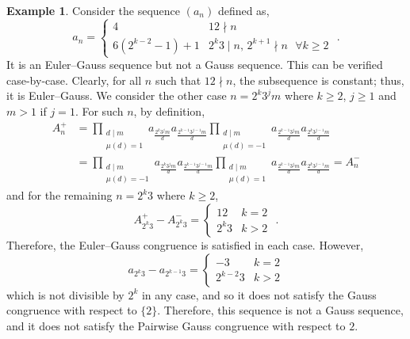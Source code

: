 \documentclass{article}
\numberwithin{equation}{section}
\theoremstyle{definition}
\newtheorem{example}[definition]{\bf {Example}}
\begin{document}
\begin{example}\label{ex:2}
    Consider the sequence $(a_n)$ defined as, 
\[
    a_n=
    \begin{cases}
        4 & 12 \nmid n\\
        6(2^{k-2}-1)+1 & 2^k3\mid n\text{, }2^{k+1}\nmid n\text{ }\forall k\geq2
    \end{cases}
    \text{ .}
\]
It is an Euler--Gauss sequence but not a Gauss sequence. This can be verified case-by-case. Clearly, for all $n$ such that $12\nmid n$, the subsequence is constant; thus, it is Euler--Gauss. We consider the other case $n=2^k3^jm$ where $k\geq2$, $j\geq1$ and $m>1$ if $j=1$. For such $n$, by definition,
\begin{align*}
    A_n^+&=\prod_{\substack{d\mid m\\\mu(d)=1}}a_\frac{2^k3^jm}{d}a_\frac{2^{k-1}3^{j-1}m}{d}\prod_{\substack{d\mid m\\\mu(d)=-1}}a_\frac{2^{k-1}3^jm}{d}a_\frac{2^k3^{j-1}m}{d}\\&=\prod_{\substack{d\mid m\\\mu(d)=-1}}a_\frac{2^k3^jm}{d}a_\frac{2^{k-1}3^{j-1}m}{d}\prod_{\substack{d\mid m\\\mu(d)=1}}a_\frac{2^{k-1}3^jm}{d}a_\frac{2^k3^{j-1}m}{d}=A_n^-
\end{align*}
and for the remaining $n=2^k3$ where $k\geq2$,  
\[A_{2^k3}^+-A_{2^k3}^-=\begin{cases}
    12 &k=2\\
    2^{k}3&k>2
\end{cases}
\text{ .}
\]
Therefore, the Euler--Gauss congruence is satisfied in each case. However,  
\[a_{2^k3}-a_{2^{k-1}3}=\begin{cases}
    -3 &k=2\\
    2^{k-2}3&k>2
\end{cases}\]
which is not divisible by $2^k$ in any case, and so it does not satisfy the Gauss congruence with respect to $\{2\}$. Therefore, this sequence is not a Gauss sequence, and it does not satisfy the Pairwise Gauss congruence with respect to $2$.  


\end{example}
\end{document}
